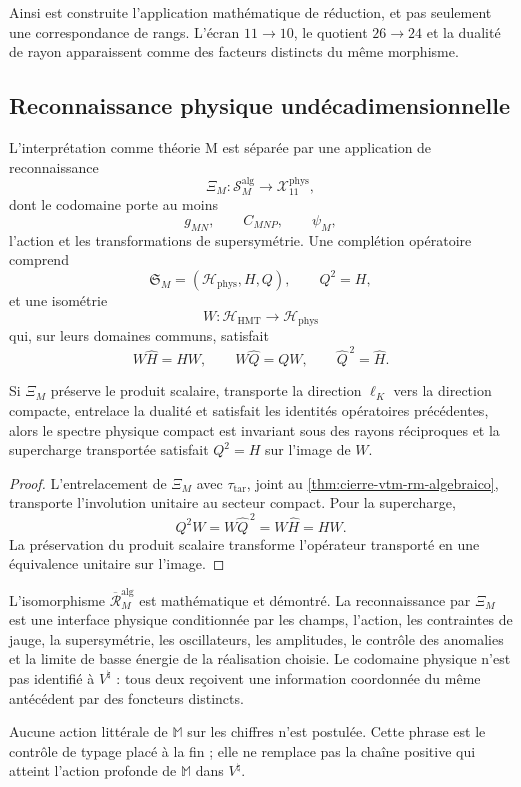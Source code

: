 Ainsi est construite l'application mathématique de réduction, et pas seulement une
correspondance de rangs. L'écran \(11\to10\), le quotient
\(26\to24\) et la dualité de rayon apparaissent comme des facteurs distincts du
même morphisme.

\subsection{Reconnaissance physique undécadimensionnelle}

L'interprétation comme théorie M est séparée par une application de reconnaissance
\[
 \Xi_M:\mathscr S_M^{\mathrm{alg}}
 \longrightarrow\mathcal X_{11}^{\mathrm{phys}},
\]
dont le codomaine porte au moins
\[
 g_{MN},\qquad C_{MNP},\qquad\psi_M,
\]
l'action et les transformations de supersymétrie. Une complétion
opératoire comprend
\[
 \mathfrak S_M=(\mathcal H_{\mathrm{phys}},H,Q),
 \qquad Q^2=H,
\]
et une isométrie
\[
 W:\mathcal H_{\mathrm{HMT}}\longrightarrow\mathcal H_{\mathrm{phys}}
\]
qui, sur leurs domaines communs, satisfait
\[
 W\widehat H=HW,
 \qquad W\widehat Q=QW,
 \qquad \widehat Q^{\,2}=\widehat H.
\]

\begin{theorem}
\label{thm:cierre-vtm-reconocimiento-fisico-m}
Si \(\Xi_M\) préserve le produit scalaire, transporte la direction
\(\ell_K\) vers la direction compacte, entrelace la dualité et satisfait les
identités opératoires précédentes, alors le spectre physique compact est
invariant sous des rayons réciproques et la supercharge transportée satisfait
\(Q^2=H\) sur l'image de \(W\).
\end{theorem}

\begin{proof}
L'entrelacement de \(\Xi_M\) avec \(\tau_{\mathrm{tar}}\), joint au
\cref{thm:cierre-vtm-rm-algebraico}, transporte l'involution unitaire au
secteur compact. Pour la supercharge,
\[
 Q^2W=W\widehat Q^{\,2}=W\widehat H=HW.
\]
La préservation du produit scalaire transforme l'opérateur transporté en
une équivalence unitaire sur l'image.
\end{proof}

L'isomorphisme
\(\overline{\mathcal R}_M^{\mathrm{alg}}\) est mathématique et démontré.
La reconnaissance par \(\Xi_M\) est une interface physique conditionnée par les
champs, l'action, les contraintes de jauge, la supersymétrie, les
oscillateurs, les amplitudes, le contrôle des anomalies et la limite de basse
énergie de la réalisation choisie. Le codomaine physique n'est pas identifié à
\(V^\natural\) : tous deux reçoivent une information coordonnée du même antécédent
par des foncteurs distincts.

Aucune action littérale de \(\mathbb M\) sur les chiffres n'est postulée. Cette phrase est
le contrôle de typage placé à la fin ; elle ne remplace pas la chaîne positive qui
atteint l'action profonde de \(\mathbb M\) dans \(V^\natural\).
